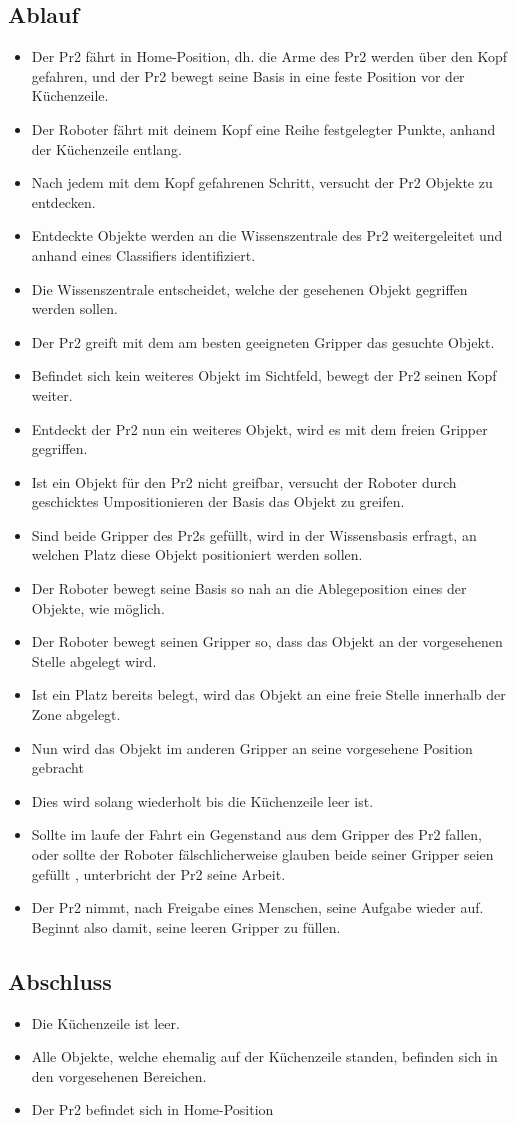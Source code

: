 \documentclass{suturo}
\begin{document}
\subsection{Ablauf}
\begin{itemize}
\item Der Pr2 fährt in Home-Position, dh. die Arme des Pr2 werden über den Kopf gefahren, und der Pr2 bewegt seine Basis in eine feste Position vor der Küchenzeile.
\item Der Roboter fährt mit deinem Kopf eine Reihe festgelegter Punkte, anhand der Küchenzeile entlang.
\item Nach jedem mit dem Kopf gefahrenen Schritt, versucht der Pr2 Objekte zu entdecken. 
\item Entdeckte Objekte werden an die Wissenszentrale des Pr2 weitergeleitet und anhand eines Classifiers identifiziert.
\item Die Wissenszentrale entscheidet, welche der gesehenen Objekt gegriffen werden sollen.
\item Der Pr2 greift mit dem am besten geeigneten Gripper das gesuchte Objekt. 
\item Befindet sich kein weiteres Objekt im Sichtfeld, bewegt der Pr2 seinen Kopf weiter. 
\item Entdeckt der Pr2 nun ein weiteres Objekt, wird es mit dem freien Gripper gegriffen.
\item Ist ein Objekt für den Pr2 nicht greifbar, versucht der Roboter durch geschicktes Umpositionieren der Basis das Objekt zu greifen.
\item Sind beide Gripper des Pr2s gefüllt, wird in der Wissensbasis erfragt, an welchen Platz diese Objekt positioniert werden sollen.
\item Der Roboter bewegt seine Basis so nah an die Ablegeposition eines der Objekte, wie möglich.
\item Der Roboter bewegt seinen Gripper so, dass das Objekt an der vorgesehenen Stelle abgelegt wird.
\item Ist ein Platz bereits belegt, wird das Objekt an eine freie Stelle innerhalb der Zone abgelegt.
\item Nun wird das Objekt im anderen Gripper an seine vorgesehene Position gebracht
\item Dies wird solang wiederholt bis die Küchenzeile leer ist.
\item Sollte im laufe der Fahrt ein Gegenstand aus dem Gripper des Pr2 fallen, oder sollte der Roboter fälschlicherweise glauben beide seiner Gripper seien gefüllt , unterbricht der Pr2 seine Arbeit.
\item Der Pr2 nimmt, nach Freigabe eines Menschen, seine Aufgabe wieder auf. Beginnt also damit, seine leeren Gripper zu füllen.
\end{itemize}


\subsection{Abschluss}
\begin{itemize}
\item Die Küchenzeile ist leer.
\item Alle Objekte, welche ehemalig auf der Küchenzeile standen, befinden sich in den vorgesehenen Bereichen.
\item Der Pr2 befindet sich in Home-Position
\end{itemize}
\end{document}
